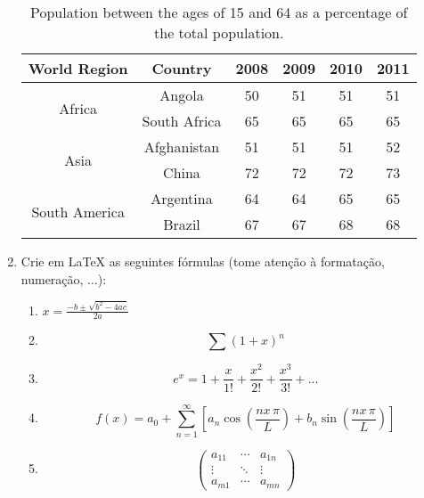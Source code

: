 \begin{enumerate}
\begin{table}[!h]
\centering
\caption{Population between the ages of 15 and 64 as a percentage of the total population.} 
\begin{tabular}{c||c|c|c|c|c}
\hline\hline
World Region             & Country        & 2008    & 2009  & 2010  & 2011\\ \hline\hline
\multirow{2}{*}{Africa}  & Angola         & 50 	    & 51    & 51    & 51\\
                         & South Africa   & 65      & 65    & 65    & 65 \\\hline
\multirow{2}{*}{Asia}    & Afghanistan    & 51      & 51    & 51    & 52\\
                         & China 	  & 72      & 72    & 72    & 73\\\hline
\multirow{2}{*}{South America}   & Argentina     & 64 	& 64 	& 65 	& 65 \\	
                                 & Brazil 	& 67 	& 67 	& 68 	&68 \\
\hline\hline
\end{tabular}
\label{tab:tab}
\end{table}

\item Crie em \LaTeX{} as seguintes fórmulas (tome atenção à formatação, numeração, $\ldots$):
\begin{enumerate}
\item $x = \frac{-b \pm \sqrt{b^2 - 4ac}}{2a}$

\item 
\[
\sum (1+x)^n
\]

\item
\begin{equation}
e^x=1+\frac{x}{1!}+\frac{x^2}{2!}+\frac{x^3}{3!}+...
\end{equation}

\item 
\begin{equation}
f(x)=a_0+\sum_{n=1}^\infty \left [ a_n \cos\left ( \frac{nx\,\pi}{L} \right ) + b_n \sin\left ( \frac{nx\,\pi}{L} \right ) \right ]
\end{equation}

\item 
\[
\begin{pmatrix}
 a_{11} & \cdots & a_{1n}\\ 
 \vdots & \ddots & \vdots\\ 
 a_{m1} & \cdots & a_{mn}
 \end{pmatrix}
\]

\end{enumerate}

\end{enumerate}

